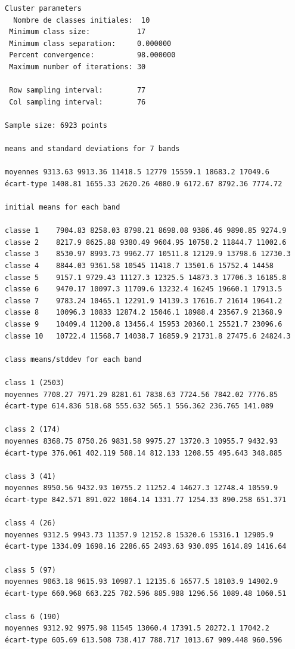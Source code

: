 \documentclass[earth,article,accept,pdftex,moreauthors]{Definitions/mdpi}
\begin{document}
{\begin{scriptsize}
\begin{verbatim}
Cluster parameters
  Nombre de classes initiales: 	10
 Minimum class size:           17
 Minimum class separation:     0.000000
 Percent convergence:          98.000000
 Maximum number of iterations: 30

 Row sampling interval:        77
 Col sampling interval:        76

Sample size: 6923 points

means and standard deviations for 7 bands

moyennes 9313.63 9913.36 11418.5 12779 15559.1 18683.2 17049.6
écart-type 1408.81 1655.33 2620.26 4080.9 6172.67 8792.36 7774.72

initial means for each band

classe 1    7904.83 8258.03 8798.21 8698.08 9386.46 9890.85 9274.9
classe 2    8217.9 8625.88 9380.49 9604.95 10758.2 11844.7 11002.6
classe 3    8530.97 8993.73 9962.77 10511.8 12129.9 13798.6 12730.3
classe 4    8844.03 9361.58 10545 11418.7 13501.6 15752.4 14458
classe 5    9157.1 9729.43 11127.3 12325.5 14873.3 17706.3 16185.8
classe 6    9470.17 10097.3 11709.6 13232.4 16245 19660.1 17913.5
classe 7    9783.24 10465.1 12291.9 14139.3 17616.7 21614 19641.2
classe 8    10096.3 10833 12874.2 15046.1 18988.4 23567.9 21368.9
classe 9    10409.4 11200.8 13456.4 15953 20360.1 25521.7 23096.6
classe 10   10722.4 11568.7 14038.7 16859.9 21731.8 27475.6 24824.3

class means/stddev for each band

class 1 (2503)
moyennes 7708.27 7971.29 8281.61 7838.63 7724.56 7842.02 7776.85
écart-type 614.836 518.68 555.632 565.1 556.362 236.765 141.089

class 2 (174)
moyennes 8368.75 8750.26 9831.58 9975.27 13720.3 10955.7 9432.93
écart-type 376.061 402.119 588.14 812.133 1208.55 495.643 348.885

class 3 (41)
moyennes 8950.56 9432.93 10755.2 11252.4 14627.3 12748.4 10559.9
écart-type 842.571 891.022 1064.14 1331.77 1254.33 890.258 651.371

class 4 (26)
moyennes 9312.5 9943.73 11357.9 12152.8 15320.6 15316.1 12905.9
écart-type 1334.09 1698.16 2286.65 2493.63 930.095 1614.89 1416.64

class 5 (97)
moyennes 9063.18 9615.93 10987.1 12135.6 16577.5 18103.9 14902.9
écart-type 660.968 663.225 782.596 885.988 1296.56 1089.48 1060.51

class 6 (190)
moyennes 9312.92 9975.98 11545 13060.4 17391.5 20272.1 17042.2
écart-type 605.69 613.508 738.417 788.717 1013.67 909.448 960.596


\end{verbatim}
\end{scriptsize}}
\end{document}

